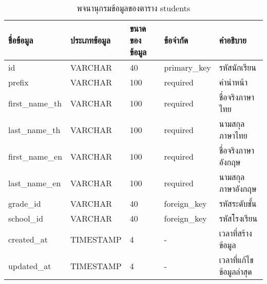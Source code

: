 \begin{table}[H]
    \caption{พจนานุกรมข้อมูลของตาราง students}
    \label{tab:database-students}
    \begin{tabularx}{\textwidth}{ | p{2.4cm} | p{2.20cm} | p{2.45cm} | p{2.05cm} | X | }
    \hline
    \textbf{ชื่อข้อมูล} & \textbf{ประเภทข้อมูล} & \textbf{ขนาดของข้อมูล} & \textbf{ข้อจำกัด} & \textbf{คำอธิบาย} \\
    \hline
    id & VARCHAR & 40 & primary\_key & รหัสนักเรียน \\
    \hline
    prefix & VARCHAR & 100 & required & คำนำหน้า \\
    \hline
    first\_name\_th & VARCHAR & 100 & required & ชื่อจริงภาษาไทย \\
    \hline
    last\_name\_th & VARCHAR & 100 & required & นามสกุลภาษาไทย \\
    \hline
    first\_name\_en & VARCHAR & 100 & required & ชื่อจริงภาษาอังกฤษ \\
    \hline
    last\_name\_en & VARCHAR & 100 & required & นามสกุลภาษาอังกฤษ \\
    \hline
    grade\_id & VARCHAR & 40 & foreign\_key & รหัสระดับชั้น \\
    \hline
    school\_id & VARCHAR & 40 & foreign\_key & รหัสโรงเรียน \\
    \hline
    created\_at & TIMESTAMP & 4 & - & เวลาที่สร้างข้อมูล \\
    \hline
    updated\_at & TIMESTAMP & 4 & - & เวลาที่แก้ไขข้อมูลล่าสุด \\
    \hline
    \end{tabularx}
\end{table}

